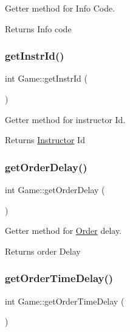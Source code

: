 Getter method for Info Code. 

\begin{DoxyReturn}{Returns}
Info code 
\end{DoxyReturn}
\mbox{\label{class_game_a52dd61290996a492087b81464eba52c8}} 
\subsubsection{\texorpdfstring{get\+Instr\+Id()}{getInstrId()}}
{\footnotesize\ttfamily int Game\+::get\+Instr\+Id (\begin{DoxyParamCaption}{ }\end{DoxyParamCaption})}



Getter method for instructor Id. 

\begin{DoxyReturn}{Returns}
\hyperlink{class_instructor}{Instructor} Id 
\end{DoxyReturn}
\mbox{\label{class_game_ab8a2d3843e55b53345bdb80b6b1e6503}} 
\subsubsection{\texorpdfstring{get\+Order\+Delay()}{getOrderDelay()}}
{\footnotesize\ttfamily int Game\+::get\+Order\+Delay (\begin{DoxyParamCaption}{ }\end{DoxyParamCaption})}



Getter method for \hyperlink{class_order}{Order} delay. 

\begin{DoxyReturn}{Returns}
order Delay 
\end{DoxyReturn}
\mbox{\label{class_game_a61aed9159fe6130486be8034f3e28086}} 
\subsubsection{\texorpdfstring{get\+Order\+Time\+Delay()}{getOrderTimeDelay()}}
{\footnotesize\ttfamily int Game\+::get\+Order\+Time\+Delay (\begin{DoxyParamCaption}{ }\end{DoxyParamCaption})}



